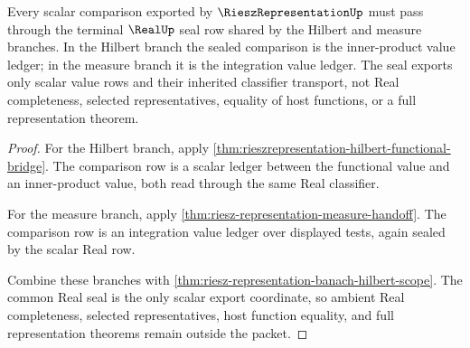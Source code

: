 \begin{theorem}
\label{thm:riesz-representation-real-seal-obligation}
Every scalar comparison exported by $\RieszRepresentationUp$ must pass through the terminal $\RealUp$ seal row shared by the Hilbert and measure branches. In the Hilbert branch the sealed comparison is the inner-product value ledger; in the measure branch it is the integration value ledger. The seal exports only scalar value rows and their inherited classifier transport, not Real completeness, selected representatives, equality of host functions, or a full representation theorem.
\end{theorem}
\begin{proof}
For the Hilbert branch, apply \autoref{thm:rieszrepresentation-hilbert-functional-bridge}. The comparison row is a scalar ledger between the functional value and an inner-product value, both read through the same Real classifier.

For the measure branch, apply \autoref{thm:riesz-representation-measure-handoff}. The comparison row is an integration value ledger over displayed tests, again sealed by the scalar Real row.

Combine these branches with \autoref{thm:riesz-representation-banach-hilbert-scope}. The common Real seal is the only scalar export coordinate, so ambient Real completeness, selected representatives, host function equality, and full representation theorems remain outside the packet.
\end{proof}

